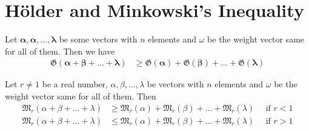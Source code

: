 \documentclass[inequalities.tex]{subfile}
\begin{document}
	
	\section{H\"{o}lder and Minkowski's Inequality}\label{sec:holdmink}
	
		\begin{theorem}\label{thm:holder}
			Let $\mathbf{\alpha},\mathbf{\alpha},\ldots,\mathbf{\lambda}$ be some vectors with $n$ elements and $\omega$ be the weight vector same for all of them. Then we have
				\begin{align*}
					\mathfrak{G}(\mathbf{\alpha}+\mathbf{\beta}+\ldots+\mathbf{\lambda})
						& \geq \mathfrak{G}(\mathbf{\mathbf{\alpha}})+\mathfrak{G}(\mathbf{\beta})+\ldots+\mathfrak{G}(\mathbf{\lambda})
				\end{align*}
		\end{theorem}
	
		\begin{theorem}\label{thm:mink}
			Let $r\neq 1$ be a real number, $\alpha,\beta,\ldots,\lambda$ be vectors with $n$ elements and $\omega$ be the weight vector same for all of them. Then
				\begin{align*}
					\mathfrak{M}_{r}(\alpha+\beta+\ldots+\lambda)
						& \geq \mathfrak{M}_{r}(\alpha)+\mathfrak{M}_{r}(\beta)+\ldots+\mathfrak{M}_{r}(\lambda)\quad\mbox{ if }r<1\\
					\mathfrak{M}_{r}(\alpha+\beta+\ldots+\lambda)
					& \leq \mathfrak{M}_{r}(\alpha)+\mathfrak{M}_{r}(\beta)+\ldots+\mathfrak{M}_{r}(\lambda)\quad\mbox{ if }r>1
				\end{align*}
		\end{theorem}
\end{document}
